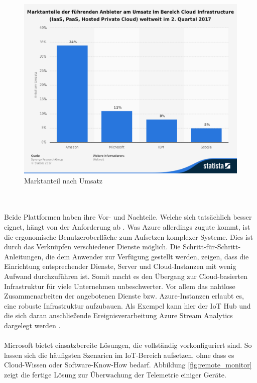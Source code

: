\begin{figure}[ht!]
	\centering
	\includegraphics[width=1.0\linewidth]{images/statistik}
	\caption{Marktanteil nach Umsatz \cite{Statista.2017b}} %
	\label{fig:statistik}
\end{figure}
\\ \\Beide Plattformen haben ihre Vor- und Nachteile. Welche sich tatsächlich besser eignet, hängt von der Anforderung ab \cite{PeterTsai.2016}. Was Azure allerdings zugute kommt, ist die ergonomische Benutzeroberfläche zum Aufsetzen komplexer Systeme. Dies ist durch das Verknüpfen verschiedener Dienste möglich. Die Schritt-für-Schritt-Anleitungen, die dem Anwender zur Verfügung gestellt werden, zeigen, dass die Einrichtung entsprechender Dienste, Server und Cloud-Instanzen mit wenig Aufwand durchzuführen ist. Somit macht es den Übergang zur Cloud-basierten Infrastruktur für viele Unternehmen unbeschwerter. Vor allem das nahtlose Zusammenarbeiten der angebotenen Dienste bzw. Azure-Instanzen erlaubt es, eine robuste Infrastruktur aufzubauen. Als Exempel kann hier der IoT Hub und die sich daran anschließende Ereignisverarbeitung Azure Stream Analytics dargelegt werden \cite{PeterTsai.2016}.\\ \\
Microsoft bietet einsatzbereite Lösungen, die vollständig vorkonfiguriert sind. So lassen sich die häufigsten Szenarien im IoT-Bereich aufsetzen, ohne dass es Cloud-Wissen oder Software-Know-How bedarf. Abbildung \ref{fig:remote_monitor} zeigt die fertige Lösung zur Überwachung der Telemetrie einiger Geräte.
